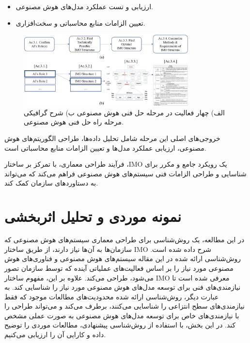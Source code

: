 \documentclass[a4paper,10pt]{article}
\begin{document}
\begin{itemize}
\begin{itemize}
                        \item ارزیابی و تست عملکرد مدل‌های هوش مصنوعی.

                        \item تعیین الزامات منابع محاسباتی و سخت‌افزاری.

                    \end{itemize}

                    \begin{figure}[htbp]

                        \centering
                        \includegraphics[width=0.8\textwidth]{image/fig 8.png}
                        \caption{الف) چهار فعالیت در مرحله حل فنی هوش مصنوعی ب) شرح گرافیکی مرحله راه حل فنی هوش مصنوعی.}
                        \label{fig:fig_8}
                    
                    \end{figure}

                    خروجی‌های اصلی این مرحله شامل تحلیل داده‌ها، طراحی الگوریتم‌های هوش مصنوعی، ارزیابی عملکرد مدل‌ها و تعیین الزامات منابع محاسباتی است.

                \end{itemize}

                فرآیند طراحی معماری، با تمرکز بر ساختار ،IMO یک رویکرد جامع و مکرر برای شناسایی و طراحی الزامات فنی سیستم‌های هوش مصنوعی فراهم می‌کند که می‌تواند به دستاوردهای سازمان کمک کند.

    \section{نمونه موردی و تحلیل اثربخشی}

        در این مطالعه، یک روش‌شناسی برای طراحی معماری سیستم‌های هوش مصنوعی که سازمان‌ها به آن‌ها نیاز دارند، از طریق ساختار IMO شرح داده شده است. روش‌شناسی ارائه شده در این مقاله سیستم‌های هوش مصنوعی و فناوری‌های هوش مصنوعی مورد نیاز را بر اساس فعالیت‌های عملیاتی آینده که توسط سازمان تصور می‌شود، طراحی می‌کند. علاوه بر این، مفهوم ساختار IMO معرفی شده است تا نیازمندی‌های فنی برای توسعه مدل‌های هوش مصنوعی مورد نیاز را شناسایی کند. به عبارت دیگر، روش‌شناسی ارائه شده محدودیت‌های مطالعات موجود که فقط نیازمندی‌های سطح انتزاعی را شناسایی می‌کنند، برطرف می‌کند و می‌تواند طراحی را با نیازمندی‌های خاص برای توسعه مدل‌های هوش مصنوعی به صورت عملی مشخص کند. در این بخش، با استفاده از روش‌شناسی پیشنهادی، مطالعات موردی را توضیح داده و کارایی آن را ارزیابی می‌کنیم.
\end{document}
